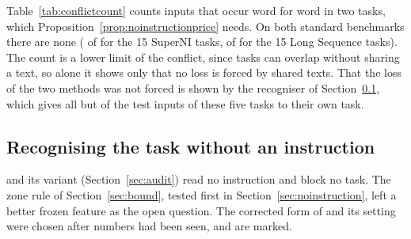 \begin{table}[t]
  \caption{The five tasks of Section~\ref{sec:five}, with the definition of every task in its inputs or none. Score right after learning, final score (Rouge-L) and forgetting; answers changed: of the \AudPubCompared{} test inputs of the first four tasks, those whose answer at the end differs from the answer right after their task was learned (the last task cannot be forgotten). Rows of ours: plain adapters never blocked, with the routes of Section~\ref{sec:audit}, run without definitions only. Last row: every input sent to its own task.}
  \label{tab:noinstpublished}
  \centering
  
\end{table}

Table~\ref{tab:conflictcount} counts inputs that occur word for word in two tasks, which Proposition~\ref{prop:noinstructionprice} needs. On both standard benchmarks there are none (\AudConfOneShared{} of \AudConfOneInputs{} for the 15 SuperNI tasks, \AudConfTwoShared{} of \AudConfTwoInputs{} for the 15 Long Sequence tasks). The count is a lower limit of the conflict, since tasks can overlap without sharing a text, so alone it shows only that no loss is forced by shared texts. That the loss of the two methods was not forced is shown by the recogniser of Section~\ref{sec:recogniser}, which gives all but \AudRouteFiveRidgeNotOwn{} of the \AudRouteFiveRidgeN{} test inputs of these five tasks to their own task.

\begin{table}[t]
  \caption{Inputs that occur word for word in two or more tasks of a collection (benchmark training and test inputs; instances read from the task files for the fresh batches of Section~\ref{sec:recogniser}). ``Also elsewhere'': inputs that occur in another task of the collection; \%: their share. A count, not a test.}
  \label{tab:conflictcount}
  \centering
  
\end{table}

\subsection{Recognising the task without an instruction}
\label{sec:recogniser}

\recog{} and its variant \handicap{} (Section~\ref{sec:audit}) read no instruction and block no task. The zone rule of Section~\ref{sec:bound}, tested first in Section~\ref{sec:noinstruction}, left a better frozen feature as the open question. The corrected form of \handicap{} and its setting were chosen after numbers had been seen, and are marked.

